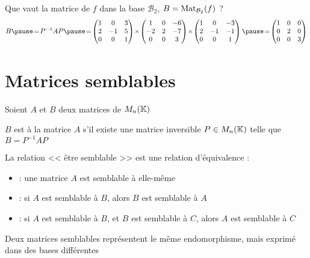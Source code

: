 \begin{frame}
\begin{exemple}
Que vaut la matrice de $f$ dans la base $\mathcal{B}_2$, $B=\mathop{\text{Mat}}\nolimits_{\mathcal{B}_2}(f)$ ?
\pause\pause
\small
  $$B \pause\!=\! P^{-1} A P \pause\!=\! 
\begin{pmatrix}
1 & 0 & 3\\
2 & -1 & 5\\
0 & 0 & 1
\end{pmatrix} \!\times\!
\begin{pmatrix}
1 & 0 & -6\\
-2 & 2 & -7\\
0 & 0 & 3
\end{pmatrix}
\!\times \!
\begin{pmatrix}
1 & 0 & -3\\
2 & -1 & -1\\
0 & 0 & 1
\end{pmatrix}
\pause\!=\!
\begin{pmatrix}
1 & 0 & 0\\
0 & 2 & 0\\
0 & 0 & 3
\end{pmatrix}$$ 
\end{exemple}
\end{frame}

\section{Matrices semblables}

\begin{frame}
Soient $A$ et $B$ deux matrices de $M_n(\mathbb{K})$
\begin{mydefinition}
$B$ est  à la matrice $A$ s'il existe une
matrice inversible $P \in M_n(\mathbb{K})$ telle que
$B=P^{-1}AP$
\end{mydefinition}

\pause

La relation << être semblable >> est une relation d'équivalence \pause:
\begin{proposition}
\begin{itemize}
  \item {} : une matrice $A$ est semblable à elle-même
  \pause
  \item {} : si $A$ est semblable à $B$, 
  alors $B$ est semblable à $A$
  \pause
  \item {} : si $A$ est semblable à $B$, 
  et $B$ est semblable à $C$, alors $A$ est semblable à $C$
\end{itemize}
\end{proposition}

\pause

\begin{corollaire}
Deux matrices semblables représentent le même endomorphisme, mais exprimé dans
des bases différentes
\end{corollaire}
\end{frame}


